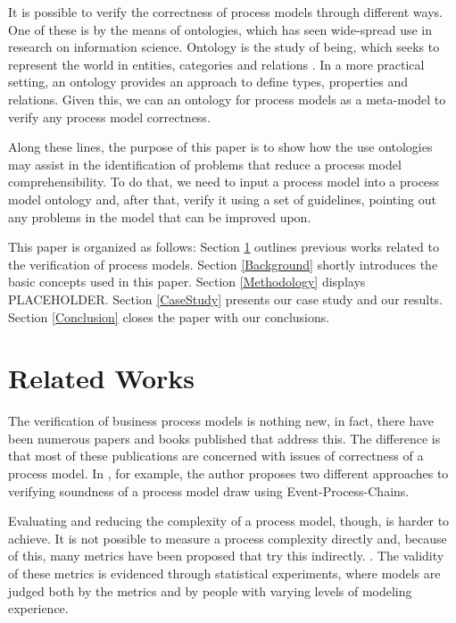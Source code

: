 \documentclass{llncs}
\begin{document}
It is possible to verify the correctness of process models through different ways. One of these is by the means of ontologies, which has seen wide-spread use in research on information science. Ontology is the study of being, which seeks to represent the world in entities, categories and relations \cite{Mendling2008}. In a more practical setting, an ontology provides an approach to define types, properties and relations. Given this, we can an ontology for process models as a meta-model to verify any process model correctness.


Along these lines, the purpose of this paper is to show how the use ontologies may assist in the identification of problems that reduce a process model comprehensibility. To do that, we need to input a process model into a process model ontology and, after that, verify it using a set of guidelines, pointing out any problems in the model that can be improved upon.


This paper is organized as follows: Section \ref{RelatedWorks} outlines previous works related to the verification of process models. Section \ref{Background} shortly introduces the basic concepts used in this paper. Section \ref{Methodology} displays PLACEHOLDER. Section \ref{CaseStudy} presents our case study and our results. Section \ref{Conclusion} closes the paper with our conclusions.

\section{Related Works}\label{RelatedWorks}


The verification of business process models is nothing new, in fact, there have been numerous papers and books published that address this. The difference is that most of these publications are concerned with issues of correctness of a process model. In \cite{Mendling2008}, for example, the author proposes two different approaches to verifying soundness of a process model draw using Event-Process-Chains.
	
Evaluating and reducing the complexity of a process model, though, is harder to achieve. It is not possible to measure a process complexity directly and, because of this, many metrics have been proposed that try this indirectly. \cite{?}. The validity of these metrics is evidenced through statistical experiments, where models are judged both by the metrics and by people with varying levels of modeling experience.
\end{document}
